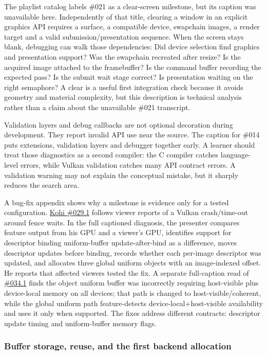 The playlist catalog labels \#021 as a clear-screen milestone, but its caption was unavailable here. Independently of that title, clearing a window in an explicit graphics API requires a surface, a compatible device, swapchain images, a render target and a valid submission/presentation sequence. When the screen stays blank, debugging can walk those dependencies: Did device selection find graphics and presentation support? Was the swapchain recreated after resize? Is the acquired image attached to the framebuffer? Is the command buffer recording the expected pass? Is the submit wait stage correct? Is presentation waiting on the right semaphore? A clear is a useful first integration check because it avoids geometry and material complexity, but this description is technical analysis rather than a claim about the unavailable \#021 transcript.

Validation layers and debug callbacks are not optional decoration during development. They report invalid API use near the source. The caption for \#014 puts extensions, validation layers and debugger together early. A learner should treat those diagnostics as a second compiler: the C compiler catches language-level errors, while Vulkan validation catches many API contract errors. A validation warning may not explain the conceptual mistake, but it sharply reduces the search area.

A bug-fix appendix shows why a milestone is evidence only for a tested configuration. \href{https://www.youtube.com/watch?v=U4QvUeUL37Y}{Kohi \#029.1} follows viewer reports of a Vulkan crash/time-out around fence waits. In the full captioned diagnosis, the presenter compares  feature output from his GPU and a viewer's GPU, identifies support for descriptor binding uniform-buffer update-after-bind as a difference, moves descriptor updates before binding, records whether each per-image descriptor was updated, and allocates three global uniform objects with an image-indexed offset. He reports that affected viewers tested the fix. A separate full-caption read of \href{https://www.youtube.com/watch?v=aD6fZ7tQSAY}{\#034.1} finds the object uniform buffer was incorrectly requiring host-visible plus device-local memory on all devices; that path is changed to host-visible/coherent, while the global uniform path feature-detects device-local+host-visible availability and uses it only when supported. The fixes address different contracts: descriptor update timing and uniform-buffer memory flags.

\subsubsection{Buffer storage, reuse, and the first backend allocation}\label{06-engine-ii-ch025-buffer-storage-reuse-and-the-first-backend-allocation}

